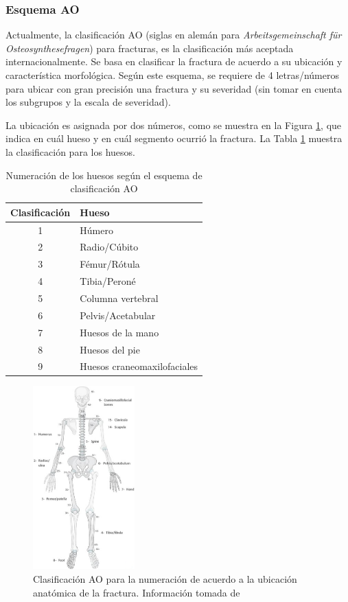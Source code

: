 \subsubsection{Esquema AO}

Actualmente, la clasificaci\'on AO (siglas en alem\'an para \textit{Arbeitsgemeinschaft f\"{u}r Osteosynthesefragen}) para fracturas, es la clasificaci\'on m\'as aceptada internacionalmente. Se basa en clasificar la fractura de acuerdo a su ubicaci\'on y caracter\'istica morfol\'ogica. Seg\'un este esquema, se requiere de 4 letras/n\'umeros para ubicar con gran precisi\'on una fractura y su severidad (sin tomar en cuenta los subgrupos y la escala de severidad). 

La ubicaci\'on es asignada por dos n\'umeros, como se muestra en la Figura \ref{fig:AO}, que indica en cu\'al hueso y en cu\'al segmento ocurri\'o la fractura. La Tabla \ref{tab:AO} muestra la clasificaci\'on para los huesos.
\begin{table}
\begin{center}
\begin{tabular}{|c|l|}
\hline
Clasificaci\'on & Hueso \\ \hline
1 & H\'umero\\ 
2 & Radio/C\'ubito\\ 
3 & F\'emur/R\'otula\\ 
4 & Tibia/Peron\'e\\ 
5 & Columna vertebral\\ 
6 & Pelvis/Acetabular\\ 
7 & Huesos de la mano\\
8 & Huesos del pie\\ 
9 & Huesos craneomaxilofaciales\\ 
\hline
\end{tabular}	
\end{center}
\caption{Numeraci\'on de los huesos seg\'un el esquema de clasificaci\'on AO}
\label{tab:AO}
\end{table}


\begin{figure}[htb]
	\centering
		\includegraphics[width=0.35\textwidth]{images/ao_classification.png}
		\caption{Clasificaci\'on AO para la numeraci\'on de acuerdo a la ubicaci\'on anat\'omica de la fractura. Informaci\'on tomada de \cite{REF_AO}}
	\label{fig:AO}
\end{figure}


